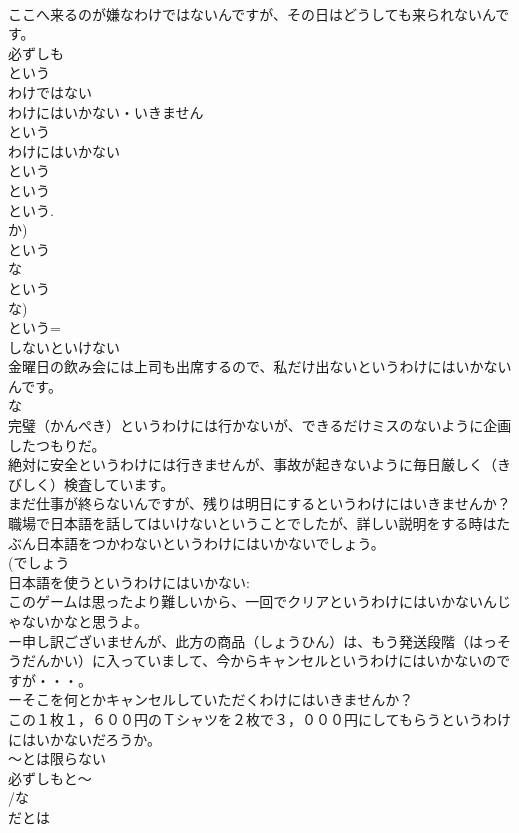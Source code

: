 \documentclass[8pt]{extreport}
\begin{document}
\begin{CJK}{UTF8}{min}
\\	ここへ来るのが嫌なわけではないんですが、その日はどうしても来られないんです。
\\	必ずしも
\\	という
\\	わけではない
\\	わけにはいかない・いきません
\\	という
\\	わけにはいかない
\\	という 
\\	という 
\\	という. 
\\	か) 
\\	という
\\	な
\\	という
\\	な)
\\	という= 
\\	しないといけない
\\	金曜日の飲み会には上司も出席するので、私だけ出ないというわけにはいかないんです。
\\	な
\\	完璧（かんぺき）というわけには行かないが、できるだけミスのないように企画したつもりだ。
\\	絶対に安全というわけには行きませんが、事故が起きないように毎日厳しく（きびしく）検査しています。
\\	まだ仕事が終らないんですが、残りは明日にするというわけにはいきませんか？
\\	職場で日本語を話してはいけないということでしたが、詳しい説明をする時はたぶん日本語をつかわないというわけにはいかないでしょう。
\\	(でしょう 
\\	日本語を使うというわけにはいかない: 
\\	このゲームは思ったより難しいから、一回でクリアというわけにはいかないんじゃないかなと思うよ。
\\	ー申し訳ございませんが、此方の商品（しょうひん）は、もう発送段階（はっそうだんかい）に入っていまして、今からキャンセルというわけにはいかないのですが・・・。
\\	ーそこを何とかキャンセルしていただくわけにはいきませんか？
\\	この１枚１，６００円のＴシャツを２枚で３，０００円にしてもらうというわけにはいかないだろうか。
\\	～とは限らない
\\	必ずしもと～
\\	/な
\\	だとは 

\end{CJK}
\end{document}
